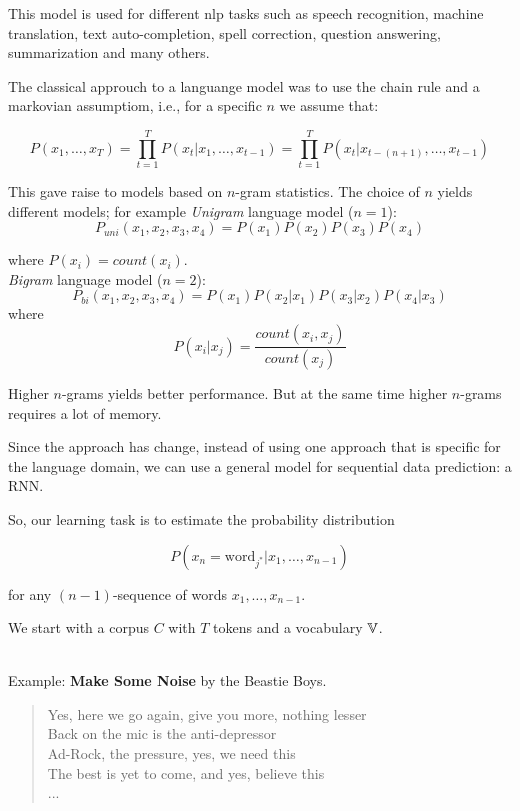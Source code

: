 This model is used for different nlp tasks such as speech recognition, machine translation, text auto-completion, spell correction, question answering, summarization and many others.

The classical approuch to a languange model was to use the chain rule and a markovian assumptiom, i.e., for a specific $n$ we assume that:

\begin{equation}
P(x_1, \dots, x_T) = \prod_{t=1}^{T} P(x_t \vert x_1, \dots, x_{t-1}) = \prod_{t=1}^{T} P(x_{t} \vert x_{t - (n+1)}, \dots, x_{t-1})
\end{equation} 


This gave raise to models based on $n$-gram statistics. The choice of $n$ yields different models; for example 
\textit{Unigram} language model ($n=1$): 
\begin{equation}
P_{uni}(x_1, x_2, x_3, x_4) = P(x_1)P(x_2)P(x_3)P(x_4)
\end{equation}

where $P(x_i) = count(x_i)$.\\

\textit{Bigram} language model ($n=2$): 
\begin{equation}
P_{bi}(x_1,x_2,x_3,x_4) = P(x_1)P(x_2\vert x_1)P(x_3\vert x_2)P(x_4\vert x_3)
\end{equation} 
where
\[
P(x_i\vert x_j) = \frac{count(x_i, x_j)}{count(x_j)}
\]


Higher $n$-grams yields better performance. But at the same time higher $n$-grams requires a lot of memory\cite{Heafield}.

Since \cite{Mikolov11} the approach has change, instead of using one approach that is specific for the language domain, we can use a general model for sequential data prediction: a RNN.

So, our learning task is to estimate the probability distribution 

\[
P(x_{n} = \text{word}_{j^{*}} | x_{1}, \dots ,x_{n-1})
\]

for any $(n-1)$-sequence of words $x_{1}, \dots ,x_{n-1}$.

We start with a corpus $C$ with $T$ tokens and a vocabulary $\mathbb{V}$.\\\

Example: \textbf{Make Some Noise} by the Beastie Boys.\\

\begin{quote}
Yes, here we go again, give you more, nothing lesser\\
Back on the mic is the anti-depressor\\
Ad-Rock, the pressure, yes, we need this\\
The best is yet to come, and yes, believe this\\
... \\
\end{quote}


